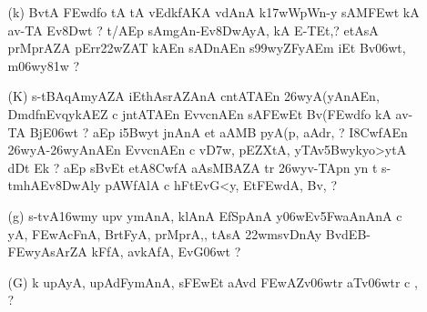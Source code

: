 \def\DevnagVersion{2.15}\documentclass{article}
\begin{document}
\begin{itemize}
\begin{itemize}
               \item[({\dn R})] {\dn Bv\306wmt\?{\rs ,\re} tFZ\0s\2-tprF\322wA, jnA, sEctA\2 EjEvkA uplN\2 f,{\rs ,\re} i(y\?tdT\?{\qvb} k\?\306wAEDfAsn\?n rA>yAEDfAn\4\396w k\? upAyA, trrFkt\0\326wyA, {\rs ?\re}}
               
               \item[({\dn c})] {\dn Eh\306wnA\2 Dm\0dAy-y d\?v-v-y c s\2 DArZAy y\? aAEDfAsEnkA, EvBgA, Ev\38Dw\306wt\?{\rs ,\re} t\? tFZ\0s\2-tprF\322wAZA\2 Ev\38DwAET\2n\2 En\3C4w\?, kA, sE\306wt s\2BAvnA, {\rs ?\re}}
               \end{itemize}
               
 \item[{\dn \dnnum \rn{18}}] \begin{itemize}
            
                \item[({\dn k})] {\dn BvtA\2 \3FEwd\?fo tA tA v\4EdkfAKA v\?dAnA\2 k\317wWpWn-y sAM\3FEwt\2 kA av-TA Ev\38Dwt\? {\rs ?\re} t/AEp sAmgAn{\rs -\re}Ev\38DwAyA, kA E-TEt,{\rs ?\re} etAsA\2 prMprAZA\2 pErr\322wZAT\0 kAEn sADnAEn s\2\399wyZFyAEm iEt Bv\306wt, m\306wy\381w\? {\rs ?\re}}
                
                \item[({\dn K})] {\dn s\2-tBAqAmyAZA iEthAsrAZAnA\2 cntATA\0En \326wyA(yA\0nAEn{\rs ,\re} Dm\0df\0nEvqykAEZ c jntATA\0En Evv\?cnAEn sA\2\3FEwEt Bv(\3FEwd\?fo kA av-TA\2 BjE\306wt {\rs ?\re} aEp i\35Bwyt\? jnAnA et\? aAMB\?{\qvb} pyA\0(p, aAdr, {\rs ?\re} I\38CwfAEn \326wyA-\326wyAnAEn Evv\?cnAEn c v\0\3D7w, pEZXtA, yTAv\35Bwykyo>ytA\2 dDt\? Ek {\rs ?\re} aEp s\2BvEt etA\38CwfA aAsMBAZA\2 tr\2 \326wyv-TApn y\?n t\? s\2-tmhAEv\38DwAly\? pAWfAlA c hFtEvG\?<y, Et\3FEwdA, Bv\?, {\rs ?\re}}
                
                \item[({\dn g})] {\dn s\2-tvA\316wmy\? upv y\0mAnA, klAnA\2{\rs ,\re} EfSpAnA\2{\rs ,\re} y\306wEv\35FwaAnAnA\2 c yA, \3FEwAcFnA, BrtFyA, prMprA,{\rs ,\re} tAsA\2 \322w\?ms\2vD\0nAy BvdEB{\rs -\re}\3FEwyAsAr\?ZA kFfA, avkAfA, EvG\306wt\? {\rs ?\re}} 
                
                \item[({\dn G})] {\dn k\? upAyA, upAdFymAnA, s\2\3FEwEt aAv\?{\qvb}d\2 \3FEwAZv\306wtr aT{\rdt}v\306wtr\2 c \0, {\rs ?\re}}
                

\end{itemize}
\end{itemize}
\end{document}

